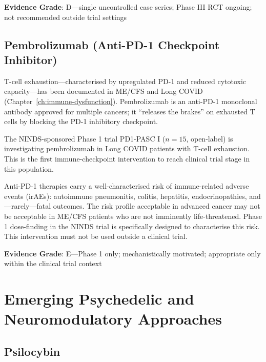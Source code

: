 \textbf{Evidence Grade}: D---single uncontrolled case series; Phase III RCT ongoing; not recommended outside trial settings

\subsection{Pembrolizumab (Anti-PD-1 Checkpoint Inhibitor)}
\label{subsec:pembrolizumab}

T-cell exhaustion---characterised by upregulated PD-1 and reduced cytotoxic capacity---has been documented in ME/CFS and Long COVID (Chapter~\ref{ch:immune-dysfunction}). Pembrolizumab is an anti-PD-1 monoclonal antibody approved for multiple cancers; it ``releases the brakes'' on exhausted T cells by blocking the PD-1 inhibitory checkpoint.

The NINDS-sponsored Phase 1 trial PD1-PASC I ($n=15$, open-label) is investigating pembrolizumab in Long COVID patients with T-cell exhaustion. This is the first immune-checkpoint intervention to reach clinical trial stage in this population.

\begin{warning}
Anti-PD-1 therapies carry a well-characterised risk of immune-related adverse events (irAEs): autoimmune pneumonitis, colitis, hepatitis, endocrinopathies, and---rarely---fatal outcomes. The risk profile acceptable in advanced cancer may not be acceptable in ME/CFS patients who are not imminently life-threatened. Phase 1 dose-finding in the NINDS trial is specifically designed to characterise this risk. This intervention must not be used outside a clinical trial.
\end{warning}

\textbf{Evidence Grade}: E---Phase 1 only; mechanistically motivated; appropriate only within the clinical trial context

\section{Emerging Psychedelic and Neuromodulatory Approaches}
\label{sec:psychedelic-neuromodulatory}

\subsection{Psilocybin}
\label{subsec:psilocybin}

